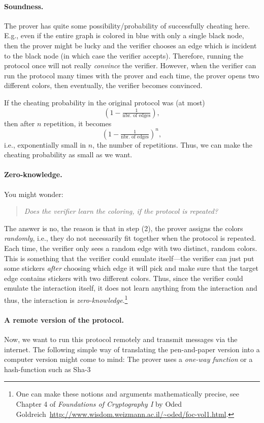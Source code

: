 \documentclass[a4paper,table,dvipsnames]{article}
\theoremstyle{definition}
\begin{document}
\paragraph{Soundness.} The prover has quite some possibility/probability of successfully cheating here. E.g., even if the entire graph is colored in blue
with only a single black node, then the prover might be lucky and the verifier chooses an edge which is
incident to the black node (in which case the verifier accepts). Therefore, running the protocol once will
not really \emph{convince} the verifier. However, when the verifier can run the protocol many times with
the prover and each time, the prover opens two different colors, then eventually, the verifier becomes
convinced.

If the cheating probability in the original protocol was (at most) 
\[\left(1-\tfrac{1}{\text{nbr. of edges}}\right),\]
then after $n$ repetition, it becomes 
\[\left(1-\tfrac{1}{\text{nbr. of edges}}\right)^n,\] i.e., exponentially small in $n$, the
number of repetitions. Thus, we can make the cheating probability as small as we want.

\paragraph{Zero-knowledge.} You might wonder: 
\begin{quote}
\emph{Does the verifier learn the coloring, if the protocol is repeated?}
\end{quote}
The answer
is no, the reason is that in step (2), the prover assigns the colors \emph{randomly}, i.e., they do not 
necessarily fit together when the protocol is repeated. Each time, the verifier only sees a random edge with
two distinct, random colors. This is something that the verifier could emulate itself---the verifier can just 
put some stickers \emph{after} choosing which edge it will pick and make sure that the target edge contains
stickers with two different colors. Thus, since the verifier could emulate the interaction itself, it does
not learn anything from the interaction and thus, the interaction is \emph{zero-knowledge}.\footnote{One can
make these notions and arguments mathematically precise, see Chapter 4 of \emph{Foundations of Cryptography I}
by Oded Goldreich~\url{http://www.wisdom.weizmann.ac.il/~oded/foc-vol1.html}.}

\paragraph{A remote version of the protocol.} Now, we want to run this protocol remotely and transmit messages
via the internet. The following simple way of translating the pen-and-paper version into a computer version might 
come to mind: The prover uses a \emph{one-way function}
or a hash-function such as Sha-3 
\end{document}
